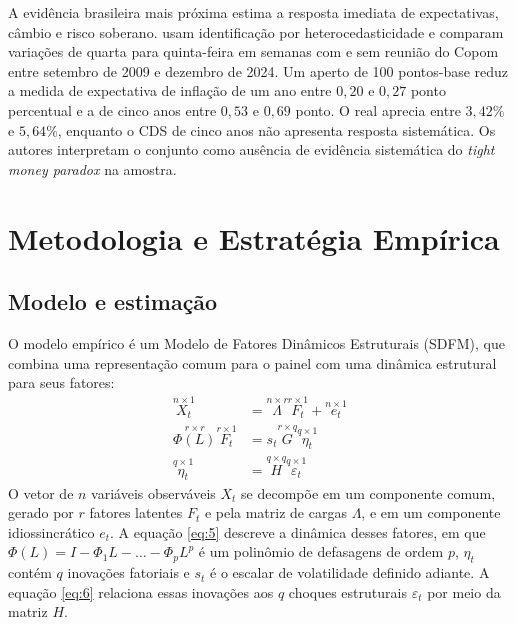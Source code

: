 \documentclass[preprint,authoryear,review,12pt]{elsarticle}
\begin{document}
A evidência brasileira mais próxima estima a resposta imediata de expectativas, câmbio e risco soberano. \cite{goncalves2025} usam identificação por heterocedasticidade \citep{rigobon2003} e comparam variações de quarta para quinta-feira em semanas com e sem reunião do Copom entre setembro de 2009 e dezembro de 2024. Um aperto de 100 pontos-base reduz a medida de expectativa de inflação de um ano entre $0{,}20$ e $0{,}27$ ponto percentual e a de cinco anos entre $0{,}53$ e $0{,}69$ ponto. O real aprecia entre $3{,}42\%$ e $5{,}64\%$, enquanto o CDS de cinco anos não apresenta resposta sistemática. Os autores interpretam o conjunto como ausência de evidência sistemática do \textit{tight money paradox} na amostra.



\section{Metodologia e Estratégia Empírica}
\label{sec:metodologia}

\subsection{Modelo e estimação}

O modelo empírico é um Modelo de Fatores Dinâmicos Estruturais (SDFM), que combina uma representação comum para o painel com uma dinâmica estrutural para seus fatores:
\begin{align}
    \overset{n\times 1}{X_t} &= \overset{n\times r}{\Lambda} \overset{r\times 1}{F_t} + \overset{n\times 1}{e_t}\label{eq:4}\\[4pt]
    \overset{r\times r}{\Phi(L)}\overset{r\times 1}{F_t} &= s_t \overset{r\times q}{G} \overset{q\times 1}{\eta_t} \label{eq:5}\\[4pt]
    \overset{q\times 1}{\eta_t} &= \overset{q\times q}{H} \overset{q\times 1}{\varepsilon_t} \label{eq:6}
\end{align}
O vetor de $n$ variáveis observáveis $X_t$ se decompõe em um componente comum, gerado por $r$ fatores latentes $F_t$ e pela matriz de cargas $\Lambda$, e em um componente idiossincrático $e_t$. A equação \ref{eq:5} descreve a dinâmica desses fatores, em que $\Phi(L) = I - \Phi_1 L - \dots - \Phi_p L^p$ é um polinômio de defasagens de ordem $p$, $\eta_t$ contém $q$ inovações fatoriais e $s_t$ é o escalar de volatilidade definido adiante. A equação \ref{eq:6} relaciona essas inovações aos $q$ choques estruturais $\varepsilon_t$ por meio da matriz $H$.
\end{document}
